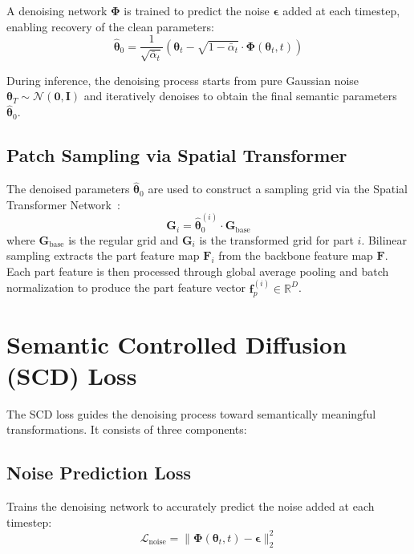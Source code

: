 A denoising network $\boldsymbol{\Phi}$ is trained to predict the noise $\boldsymbol{\epsilon}$ added at each timestep, enabling recovery of the clean parameters:
\begin{equation}
    \hat{\boldsymbol{\theta}}_0 = \frac{1}{\sqrt{\bar{\alpha}_t}} \left( \boldsymbol{\theta}_t - \sqrt{1 - \bar{\alpha}_t} \cdot \boldsymbol{\Phi}(\boldsymbol{\theta}_t, t) \right)
\end{equation}

During inference, the denoising process starts from pure Gaussian noise $\boldsymbol{\theta}_T \sim \mathcal{N}(\mathbf{0}, \mathbf{I})$ and iteratively denoises to obtain the final semantic parameters $\hat{\boldsymbol{\theta}}_0$.

\subsection{Patch Sampling via Spatial Transformer}

The denoised parameters $\hat{\boldsymbol{\theta}}_0$ are used to construct a sampling grid via the Spatial Transformer Network~\cite{jaderberg2015spatial}:
\begin{equation}
    \mathbf{G}_i = \hat{\boldsymbol{\theta}}_0^{(i)} \cdot \mathbf{G}_{\text{base}}
\end{equation}
where $\mathbf{G}_{\text{base}}$ is the regular grid and $\mathbf{G}_i$ is the transformed grid for part $i$. Bilinear sampling extracts the part feature map $\mathbf{F}_i$ from the backbone feature map $\mathbf{F}$. Each part feature is then processed through global average pooling and batch normalization to produce the part feature vector $\mathbf{f}_p^{(i)} \in \mathbb{R}^{D}$.

\section{Semantic Controlled Diffusion (SCD) Loss}

The SCD loss guides the denoising process toward semantically meaningful transformations. It consists of three components:

\subsection{Noise Prediction Loss}

Trains the denoising network to accurately predict the noise added at each timestep:
\begin{equation}
    \mathcal{L}_{\text{noise}} = \|\boldsymbol{\Phi}(\boldsymbol{\theta}_t, t) - \boldsymbol{\epsilon}\|_2^2
\end{equation}

